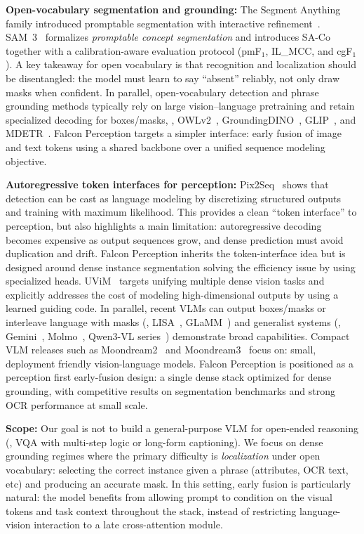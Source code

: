 \noindent \textbf{Open-vocabulary segmentation and grounding:} The Segment Anything family introduced promptable segmentation with interactive refinement~\citep{kirillov2023segment,sam2}. SAM~3~\citep{carion2025sam3} formalizes \emph{promptable concept segmentation} and introduces SA-Co together with a calibration-aware evaluation protocol (pmF$_1$, IL\_MCC, and cgF$_1$). A key takeaway for open vocabulary is that recognition and localization should be disentangled: the model must learn to say ``absent'' reliably, not only draw masks when confident. In parallel, open-vocabulary detection and phrase grounding methods typically rely on large vision--language pretraining and retain specialized decoding for boxes/masks, \eg, OWLv2~\citep{minderer2024scalingopenvocabularyobjectdetection}, GroundingDINO~\citep{Liu2023GroundingDM}, GLIP~\citep{li2022grounded}, and MDETR~\citep{kamath2021mdetr}. Falcon Perception targets a simpler interface: early fusion of image and text tokens using a shared backbone over a unified sequence modeling objective.

\noindent \textbf{Autoregressive token interfaces for perception:} Pix2Seq~\citep{chen2022pix2seq} shows that detection can be cast as language modeling by discretizing structured outputs and training with maximum likelihood. This provides a clean ``token interface'' to perception, but also highlights a main limitation: autoregressive decoding becomes expensive as output sequences grow, and dense prediction must avoid duplication and drift. Falcon Perception inherits the token-interface idea but is designed around dense instance segmentation solving the efficiency issue by using specialized heads. UViM~\citep{kolesnikov2022uvim} targets unifying multiple dense vision tasks and explicitly addresses the cost of modeling high-dimensional outputs by using a learned guiding code. In parallel, recent VLMs can output boxes/masks or interleave language with masks (\eg, LISA~\citep{lai2024lisa}, GLaMM~\citep{rasheed2024glamm}) and generalist systems (\eg, Gemini~\citep{comanici2025gemini}, Molmo~\citep{molmo}, Qwen3-VL series~\citep{qwen3}) demonstrate broad capabilities. Compact VLM releases such as Moondream2~\citep{moondream2} and Moondream3~\citep{moondream3} focus on: small, deployment friendly vision-language models. Falcon Perception is positioned as a perception first early-fusion design: a single dense stack optimized for dense grounding, with competitive results on segmentation benchmarks and strong OCR performance at small scale.

\vspace{0.5em}
\noindent \textbf{Scope:} Our goal is not to build a general-purpose VLM for open-ended reasoning (\eg, VQA with multi-step logic or long-form captioning). We focus on dense grounding regimes where the primary difficulty is \emph{localization} under open vocabulary: selecting the correct instance given a phrase (attributes, OCR text, etc) and producing an accurate mask. In this setting, early fusion is particularly natural: the model benefits from allowing prompt to condition on the visual tokens and task context throughout the stack, instead of restricting language-vision interaction to a late cross-attention module.
